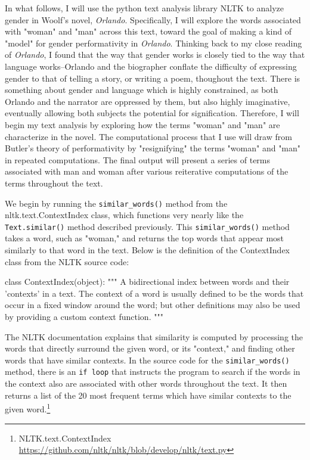 \documentclass[11pt]{article}
\begin{document}
In what follows, I will use the python text analysis library NLTK to
analyze gender in Woolf's novel, \emph{Orlando}. Specifically, I will
explore the words associated with "woman" and "man" across this text,
toward the goal of making a kind of "model" for gender performativity
in \emph{Orlando}. Thinking back to my close reading of \emph{Orlando}, I found
that the way that gender works is closely tied to the way that
language works--Orlando and the biographer conflate the difficulty of
expressing gender to that of telling a story, or writing a poem,
thoughout the text. There is something about gender and language which
is highly constrained, as both Orlando and the narrator are oppressed
by them, but also highly imaginative, eventually allowing both
subjects the potential for signification. Therefore, I will begin my
text analysis by exploring how the terms "woman" and "man" are
characterize in the novel. The computational process that I use will
draw from Butler's theory of performativity by "resignifying" the
terms "woman" and "man" in repeated computations. The final output
will present a series of terms associated with man and woman after
various reiterative computations of the terms throughout the text.

We begin by running the \texttt{similar\_words()} method from the
nltk.text.ContextIndex class, which functions very nearly like the
\texttt{Text.similar()} method described previously. This \texttt{similar\_words()}
method takes a word, such as "woman," and returns the top words that
appear most similarly to that word in the text. Below is the
definition of the ContextIndex class from the NLTK source code:

\begin{SOURCE}
class ContextIndex(object):
    """
    A bidirectional index between words and their 'contexts' in a text.
    The context of a word is usually defined to be the words that occur
    in a fixed window around the word; but other definitions may also
    be used by providing a custom context function.
    """
\end{SOURCE}

The NLTK documentation explains that similarity is computed by
processing the words that directly surround the given word, or its
"context," and finding other words that have similar contexts. In the
source code for the \texttt{similar\_words()} method, there is an \texttt{if loop}
that instructs the program to search if the words in the context also
are associated with other words throughout the text. It then returns a
list of the 20 most frequent terms which have similar contexts to the
given word.\footnote{NLTK.text.ContextIndex \url{https://github.com/nltk/nltk/blob/develop/nltk/text.py}}
\end{document}
